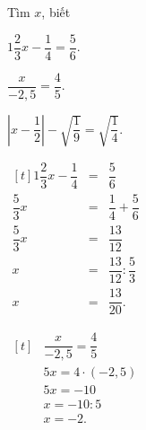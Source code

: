 		\begin{ex}%
			Tìm $x$, biết
		\begin{enumEX}{2}
		\item $1\dfrac{2}{3}x - \dfrac{1}{4} = \dfrac{5}{6}.$
		\item $\dfrac{x}{-2,5} = \dfrac{4}{5}.$
		\item $\left|x - \dfrac{1}{2}\right|- \sqrt{\dfrac{1}{9}} = \sqrt{\dfrac{1}{4}} .$
	\end{enumEX}
			\loigiai
		{
				\begin{enumEX}{2}
				\item $\begin{aligned}[t]
			1\dfrac{2}{3}x - \dfrac{1}{4}&=& \dfrac{5}{6}\\
			 \dfrac{5}{3}x& =&\dfrac{1}{4} + \dfrac{5}{6}\\
			\dfrac{5}{3}x& = &\dfrac{13}{12}\\
				 x& =& \dfrac{13}{12}: \dfrac{5}{3}\\
				 x& = &\dfrac{13}{20}.
				\end{aligned}$
				\item $\begin{aligned}[t]
			     &\dfrac{x}{-2,5} = \dfrac{4}{5}&\\
				       & 5x = 4\cdot(-2,5)&\\
				       & 5x= -10&\\
				       & x = -10:5&\\
				       & x=-2. &
							\end{aligned}$
							

\end{enumEX}}
\end{ex}
